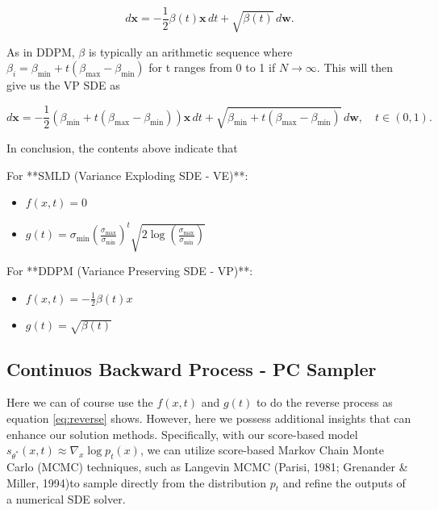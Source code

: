 \begin{equation}
d \mathbf{x} = -\frac{1}{2} \beta(t) \mathbf{x} \, dt + \sqrt{\beta(t)} \, d\mathbf{w}.\label{eq:vp-sde}
\end{equation}

\noindent
As in DDPM, $\beta$ is typically an arithmetic sequence where $\beta_i = \beta_{\min} + t (\beta_{\max} - \beta_{\min}) $ for t ranges from 0 to 1 if \( N \to \infty \). This will then give us the VP SDE as

\begin{equation}
    d \mathbf{x} = -\frac{1}{2} \left( \beta_{\min} + t (\beta_{\max} - \beta_{\min} )\right) \mathbf{x} \, dt + \sqrt{\beta_{\min} + t (\beta_{\max} - \beta_{\min})} \, d\mathbf{w}, \quad t \in (0, 1).
\end{equation}

\noindent
In conclusion, the contents above indicate that 

\noindent
For **SMLD (Variance Exploding SDE - VE)**:
\begin{itemize}
    \item \( f(x, t) = 0 \)
    \item \( g(t) = \sigma_{\min} \left( \frac{\sigma_{\max}}{\sigma_{\min}} \right)^t \sqrt{2 \log \left( \frac{\sigma_{\max}}{\sigma_{\min}} \right)} \)
\end{itemize}

\vspace{1em}

\noindent
For **DDPM (Variance Preserving SDE - VP)**:
\begin{itemize}
    \item \( f(x, t) = -\frac{1}{2} \beta(t) x \)
    \item \( g(t) = \sqrt{\beta(t)} \)
\end{itemize}

\subsection{Continuos Backward Process - PC Sampler}

Here we can of course use the $f(x,t)$ and $g(t)$ to do the reverse process as equation \eqref{eq:reverse} shows. However, here we possess additional insights that can enhance our solution methods. Specifically, with our score-based model 
$s_{\theta^*}(x, t) \approx \nabla_x \log p_t(x)
$, we can utilize score-based Markov Chain Monte Carlo (MCMC) techniques, such as Langevin MCMC (Parisi, 1981; Grenander \& Miller, 1994)to sample directly from the distribution $p_t$ and refine the outputs of a numerical SDE solver.


